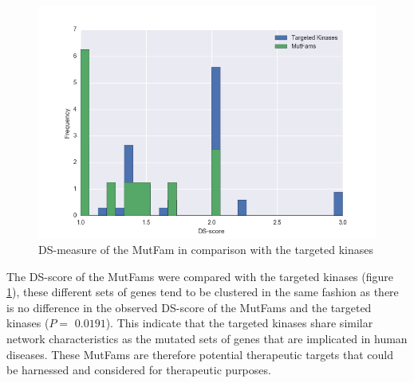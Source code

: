 \documentclass[a4paper, 11pt]{article}
\begin{document}
\begin{figure}[H]
	\includegraphics[width=\linewidth]{figures/muttarg.png}
	\centering
	\caption{DS-measure of the MutFam in comparison with the targeted kinases}
	\label{muttarg}
\end{figure}
The DS-score of the MutFams were compared with the targeted kinases (figure \ref{muttarg}), these different sets of genes tend to be clustered in the same fashion as there is no difference in the observed DS-score of the MutFams and the targeted kinases ($P=$ $0.0191$). This indicate that the targeted kinases share similar network characteristics as the mutated sets of genes that are implicated in human diseases. These MutFams are therefore potential therapeutic targets that could be harnessed and considered for therapeutic purposes.
\end{document}

